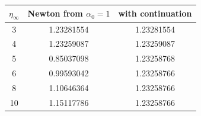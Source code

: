 \begin{tabular}{ccc}
\toprule
$\eta_\infty$ & Newton from $\alpha_0=1$ & with continuation \\
\midrule
3 & 1.23281554 & 1.23281554 \\
4 & 1.23259087 & 1.23259087 \\
5 & 0.85037098 & 1.23258768 \\
6 & 0.99593042 & 1.23258766 \\
8 & 1.10646364 & 1.23258766 \\
10 & 1.15117786 & 1.23258766 \\
\bottomrule
\end{tabular}
